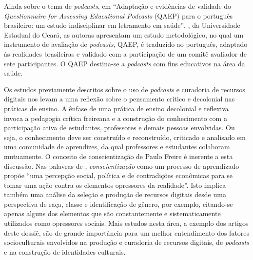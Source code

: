 \documentclass[portuguese]{textolivre}
\begin{document}
Ainda sobre o tema de \textit{podcasts}, em “Adaptação e evidências de validade do \textit{Questionnaire for Assessing Educational Podcasts} (QAEP) para o português brasileiro: um estudo indisciplinar em letramento em saúde”, \textcite{sampaio_adaptacao_2024}, da Universidade Estadual do Ceará, as autoras apresentam um estudo metodológico, no qual um instrumento de avaliação de \textit{podcasts}, QAEP, é traduzido ao português, adaptado às realidades brasileiras e validado com a participação de um comitê avaliador de sete participantes. O QAEP destina-se a \textit{podcasts} com fins educativos na área da saúde.

Os estudos previamente descritos sobre o uso de \textit{podcasts} e curadoria de recursos digitais nos levam a uma reflexão sobre o pensamento crítico e decolonial nas práticas de ensino. A ênfase de uma prática de ensino decolonial e reflexiva invoca a pedagogia crítica freireana e a construção do conhecimento com a participação ativa de estudantes, professores e demais pessoas envolvidas. Ou seja, o conhecimento deve ser construído e reconstruído, criticado e analisado em uma comunidade de aprendizes, da qual professores e estudantes colaboram mutuamente. O conceito de conscientização de Paulo Freire é inerente a esta discussão. Nas palavras de \textcite[p. 35, tradução nossa]{macedo_introduction_2005}, \textit{conscientização} como um processo de aprendizado propõe “uma percepção social, política e de contradições econômicas para se tomar uma ação contra os elementos opressores da realidade”. Isto implica também uma análise da seleção e produção de recursos digitais desde uma perspectiva de raça, classe e identificação de gênero, por exemplo, citando-se apenas alguns dos elementos que são constantemente e sistematicamente utilizados como opressores sociais. Mais estudos nesta área, a exemplo dos artigos deste dossiê, são de grande importância para um melhor entendimento dos fatores socioculturais envolvidos na produção e curadoria de recursos digitais, de \textit{podcasts} e na construção de identidades culturais. 
\end{document}
